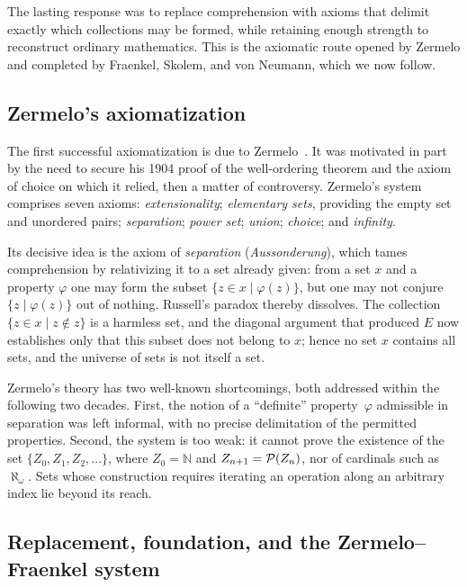 The lasting response was to replace comprehension with axioms that delimit
exactly which collections may be formed, while retaining enough strength to
reconstruct ordinary mathematics. This is the axiomatic route opened by Zermelo
and completed by Fraenkel, Skolem, and von Neumann, which we now follow.

\subsection{Zermelo's axiomatization}
\label{subsec:set-theory-zermelo}

The first successful axiomatization is due to
Zermelo~\cite{zermelo1908untersuchungen}. It was motivated in part by the need to
secure his 1904 proof of the well-ordering theorem and the axiom of choice on
which it relied, then a matter of controversy. Zermelo's system comprises seven
axioms: \emph{extensionality}; \emph{elementary sets}, providing the empty set
and unordered pairs; \emph{separation}; \emph{power set}; \emph{union};
\emph{choice}; and \emph{infinity}.

Its decisive idea is the axiom of \emph{separation} (\emph{Aussonderung}), which
tames comprehension by relativizing it to a set already given: from a set $x$
and a property $\varphi$ one may form the subset
$\{z \in x \mid \varphi(z)\}$, but one may not conjure
$\{z \mid \varphi(z)\}$ out of nothing. Russell's paradox thereby dissolves. The
collection $\{z \in x \mid z \notin z\}$ is a harmless set, and the diagonal
argument that produced $E$ now establishes only that this subset does not belong
to $x$; hence no set $x$ contains all sets, and the universe of sets is not
itself a set.

Zermelo's theory has two well-known shortcomings, both addressed within the
following two decades. First, the notion of a ``definite'' property~$\varphi$
admissible in separation was left informal, with no precise delimitation of the
permitted properties. Second, the system is too weak: it cannot prove the
existence of the set $\{Z_0, Z_1, Z_2, \dots\}$, where $Z_0 = \mathbb{N}$ and
$Z_{n+1} = \mathcal{P}(Z_n)$, nor of cardinals such as $\aleph_\omega$. Sets whose
construction requires iterating an operation along an arbitrary index lie beyond
its reach.

\subsection{Replacement, foundation, and the Zermelo--Fraenkel system}
\label{subsec:set-theory-zf}

